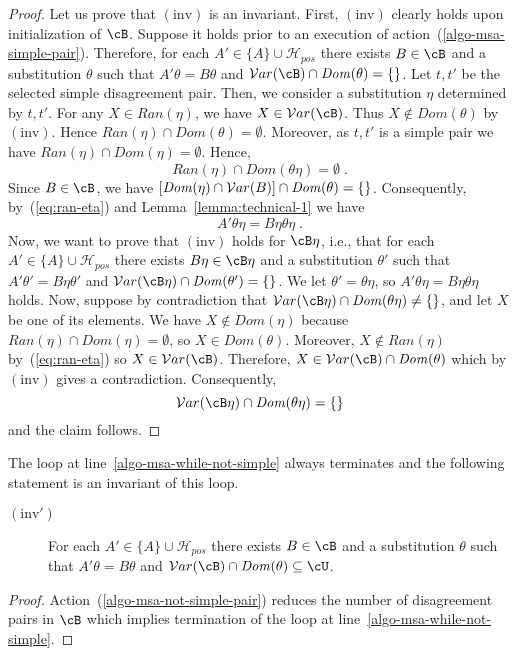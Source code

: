 \documentclass[fleqn]{tlp}
\newcommand{\Dom}{\mathit{Dom}}
\newcommand{\Ran}{\mathit{Ran}}
\newcommand{\Hpos}{\mathcal{H}_{\mathit{pos}}}
\begin{document}
\begin{appendix}
\begin{proof}
  Let us prove that $\mathrm{(inv)}$ is an invariant.
  First, $\mathrm{(inv)}$ clearly holds upon initialization
  of $\cB$. Suppose it holds prior to an execution of
  action~(\ref{algo-msa-simple-pair}).
  Therefore, for each $A'\in\{A\}\cup\Hpos$ there exists 
    $B\in\cB$ and a substitution $\theta$ such that
    $A'\theta=B\theta$ and
    $\Var(\cB)\cap\Dom(\theta)=\emptyset$.
Let $t,t'$ be the selected simple disagreement pair.
  Then, we consider a substitution $\eta$
  determined by $t,t'$. For any $X\in\Ran(\eta)$,
  we have $X\in\Var(\cB)$. 
  Thus $X\not\in\Dom(\theta)$ by $\mathrm{(inv)}$.
Hence
  $\Ran(\eta)\cap\Dom(\theta)=\emptyset$.
  Moreover, as $t,t'$ is a simple pair we have
  $\Ran(\eta)\cap\Dom(\eta)=\emptyset$. Hence,
  \begin{equation}\label{eq:ran-eta}
    \Ran(\eta)\cap\Dom(\theta\eta)=\emptyset\;.
  \end{equation}
Since $B\in\cB$, we have $[\Dom(\eta)\cap \Var(B)]\cap\Dom(\theta)=\emptyset$.
  Consequently, by~(\ref{eq:ran-eta}) and
  Lemma~\ref{lemma:technical-1} we have
  \[A'\theta\eta=B\eta\theta\eta\;.\]
Now, we want to prove that $\mathrm{(inv)}$ holds for $\cB\eta$,
  i.e., that for each $A'\in\{A\}\cup\Hpos$ there exists 
    $B\eta\in\cB\eta$ and a substitution $\theta'$ such that
    $A'\theta'=B\eta\theta'$ and
    $\Var(\cB\eta)\cap\Dom(\theta')=\emptyset$.
We let $\theta'=\theta\eta$, so $A'\theta\eta=B\eta\theta\eta$ holds.
Now, suppose by contradiction that
  $\Var(\cB\eta)\cap\Dom(\theta\eta)\neq\emptyset$, and let $X$ be one of its elements.
  We have $X\not\in\Dom(\eta)$ because
  $\Ran(\eta)\cap\Dom(\eta)=\emptyset$, so
  $X\in\Dom(\theta)$.
  Moreover, $X\not\in\Ran(\eta)$ by~(\ref{eq:ran-eta}) so
  $X\in\Var(\cB)$. Therefore,
  $X\in\Var(\cB)\cap\Dom(\theta)$
  which by $\mathrm{(inv)}$ gives a contradiction.
  Consequently, 
  \[\Var(\cB\eta)\cap\Dom(\theta\eta)=\emptyset\]
  and the claim follows.
\end{proof}

\begin{proposition}\label{proposition:invariant-correction-algo-pos-2}
  The loop at line~\ref{algo-msa-while-not-simple} always terminates
  and the following statement is an invariant of this loop.
  \begin{description}
  \item[$\mathrm{(inv')}$] For each $A'\in\{A\}\cup\Hpos$ there exists 
    $B\in\cB$ and a substitution $\theta$ such that
    $A'\theta=B\theta$ and
    $\Var(\cB)\cap\Dom(\theta)
    \subseteq \cU$.
  \end{description}
\end{proposition}
\begin{proof}
  Action~(\ref{algo-msa-not-simple-pair})
  reduces the number of disagreement pairs in
  $\cB$ which implies termination of the 
  loop at line~\ref{algo-msa-while-not-simple}.


\end{proof}
\end{appendix}
\end{document}
